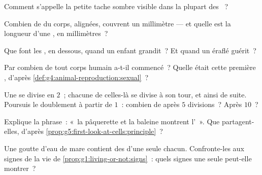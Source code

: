 \begin{exercise}[$\star$]\label{exo:g5:first-look-at-cells:4}
Comment s'appelle la petite tache sombre visible dans la plupart des
~?
\end{exercise}

\begin{exercise}[$\star$]\label{exo:g5:first-look-at-cells:5}
Combien de  du corps, alignées, couvrent un millimètre ---
et quelle est la longueur d'une , en millimètres~?
\end{exercise}

\begin{exercise}[$\star$]\label{exo:g5:first-look-at-cells:6}
Que font les , en dessous, quand un enfant grandit~? Et
quand un  éraflé guérit~?
\end{exercise}

\begin{exercise}[$\star$]\label{exo:g5:first-look-at-cells:7}
Par combien de  tout corps humain a-t-il commencé~? Quelle
était cette première , d'après
\cref{def:g4:animal-reproduction:sexual}~?
\end{exercise}

\begin{exercise}[$\star$]\label{exo:g5:first-look-at-cells:8}
Une  se divise en $2$~; chacune de celles-là se divise à son
tour, et ainsi de suite. Poursuis le doublement à partir de $1$~:
combien de  après $5$ divisions~? Après $10$~?
\end{exercise}

\begin{exercise}[$\star\star$]\label{exo:g5:first-look-at-cells:9}
Explique la phrase~: «~la pâquerette et la baleine montrent l'~». Que partagent-elles, d'après
\cref{prop:g5:first-look-at-cells:principle}~?
\end{exercise}

\begin{exercise}[$\star\star$]\label{exo:g5:first-look-at-cells:10}
Une goutte d'eau de mare contient des  d'une seule
 chacun. Confronte-les aux signes de la vie de
\cref{prop:g1:living-or-not:signs}~: quels signes une seule 
peut-elle montrer~?
\end{exercise}

